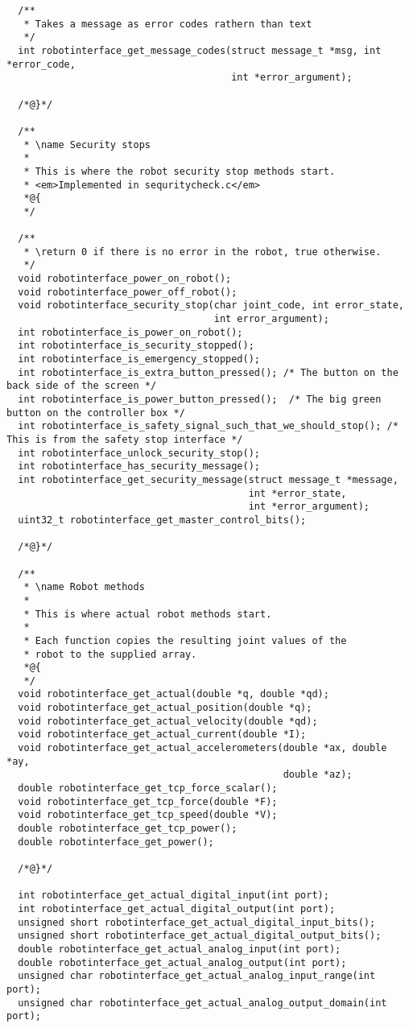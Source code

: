 \documentclass[
a4paper,
12pt,
oneside,
headsepline,		%
footsepline,		%
]{scrbook}
\begin{document}
\begin{lstlisting}
  /**
   * Takes a message as error codes rathern than text
   */
  int robotinterface_get_message_codes(struct message_t *msg, int *error_code,
                                       int *error_argument);

  /*@}*/

  /**
   * \name Security stops
   *
   * This is where the robot security stop methods start.
   * <em>Implemented in sequritycheck.c</em>
   *@{
   */

  /**
   * \return 0 if there is no error in the robot, true otherwise.
   */
  void robotinterface_power_on_robot();
  void robotinterface_power_off_robot();
  void robotinterface_security_stop(char joint_code, int error_state,
                                    int error_argument);
  int robotinterface_is_power_on_robot();
  int robotinterface_is_security_stopped();
  int robotinterface_is_emergency_stopped();
  int robotinterface_is_extra_button_pressed(); /* The button on the back side of the screen */
  int robotinterface_is_power_button_pressed();  /* The big green button on the controller box */
  int robotinterface_is_safety_signal_such_that_we_should_stop(); /* This is from the safety stop interface */
  int robotinterface_unlock_security_stop();
  int robotinterface_has_security_message();
  int robotinterface_get_security_message(struct message_t *message,
                                          int *error_state,
                                          int *error_argument);
  uint32_t robotinterface_get_master_control_bits();

  /*@}*/

  /**
   * \name Robot methods
   *
   * This is where actual robot methods start.
   *
   * Each function copies the resulting joint values of the
   * robot to the supplied array.
   *@{
   */
  void robotinterface_get_actual(double *q, double *qd);
  void robotinterface_get_actual_position(double *q);
  void robotinterface_get_actual_velocity(double *qd);
  void robotinterface_get_actual_current(double *I);
  void robotinterface_get_actual_accelerometers(double *ax, double *ay,
                                                double *az);
  double robotinterface_get_tcp_force_scalar();
  void robotinterface_get_tcp_force(double *F);
  void robotinterface_get_tcp_speed(double *V);
  double robotinterface_get_tcp_power();
  double robotinterface_get_power();

  /*@}*/

  int robotinterface_get_actual_digital_input(int port);
  int robotinterface_get_actual_digital_output(int port);
  unsigned short robotinterface_get_actual_digital_input_bits();
  unsigned short robotinterface_get_actual_digital_output_bits();
  double robotinterface_get_actual_analog_input(int port);
  double robotinterface_get_actual_analog_output(int port);
  unsigned char robotinterface_get_actual_analog_input_range(int port);
  unsigned char robotinterface_get_actual_analog_output_domain(int port);


\end{lstlisting}
\end{document}

